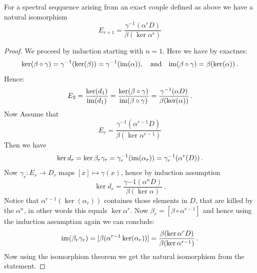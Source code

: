 \begin{corollary}\label{cor: explicit pages of exact sequences arising from exact couples}
	For a spectral seqquence arising from an exact couple defined as above we have a natural isomorphism
	\begin{equation*}
		E_{r+1}= \frac{\gamma^{-1}(\alpha^r D)}{\beta(\ker \alpha ^r)}
	\end{equation*}
\end{corollary}
\begin{proof}
	We proceed by induction starting with $n=1$.
	Here we have by exactnes:
	\begin{equation*}
		\ker(\beta \circ \gamma)=\gamma^{-1}(\ker(\beta))=\gamma^{-1}(\mathrm{im}(\alpha)),\quad \text{and}\quad
		\mathrm{im}(\beta\circ \gamma)=\beta(\ker(\alpha))\,.
	\end{equation*}
	Hence:
	\begin{equation*}
		E_2=\frac{\ker(d_1)}{\mathrm{im}(d_1)}=\frac{\ker(\beta\circ \gamma)}{\mathrm{im}(\beta \circ \gamma)}=\frac{\gamma^{-1}(\alpha D)}{\beta(\ker(\alpha))}\,.
	\end{equation*}
	Now Assume that
	\begin{equation*}
		E_r=\frac{\gamma^{-1}(\alpha^{r-1}D)}{\beta(\ker \alpha^{r-1})}
	\end{equation*}
	Then we have
	\begin{equation*}
		\ker{d_r}=\ker{\beta_r\gamma_r}=\gamma_r^{-1}(\mathrm{im}(\alpha_r))=\gamma_r^{-1}(\alpha^r(D))\,.
	\end{equation*} Now $\gamma_r:E_r\to D_r$ maps $[x]\mapsto \gamma(x)$, hence by induction assumption
	\begin{equation*}
		\ker{d_r}=\frac{\gamma{-1}(\alpha^nD)}{\beta(\ker \alpha)}\,.
	\end{equation*} Notice that $\alpha^{r-1}(\ker(\alpha_r))$ containes those elements in $D$, that are killed by the $\alpha^n$, in other words this equals $\ker \alpha^r$. Now $\beta_r=[\beta\circ \alpha^{r-1}]$ and hence using the induction assumptian again we can conclude:
	\begin{equation*}
		\mathrm{im}(\beta_r\gamma_r)=[\beta(\alpha^{r-1}\ker(\alpha_r))]=\frac{\beta(\ker\alpha^r D)}{\beta(\ker \alpha^{r-1})}\,.
	\end{equation*} Now using the isomorphism theorem we get the natural isomorphism from the statement.
\end{proof}








